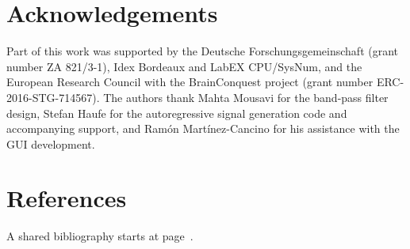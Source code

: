 \section*{Acknowledgements}

Part of this work was supported by the Deutsche Forschungsgemeinschaft (grant number ZA 821/3-1), Idex Bordeaux and LabEX CPU/SysNum, and the European Research Council with the BrainConquest project (grant number ERC-2016-STG-714567). The authors thank Mahta Mousavi for the band-pass filter design, Stefan Haufe for the autoregressive signal generation code and accompanying support, and Ram\'on Mart\'inez-Cancino for his assistance with the GUI development.


\section*{References}

A shared bibliography starts at page~\pageref{bibliography}.


\clearpage
\pagestyle{plain}
